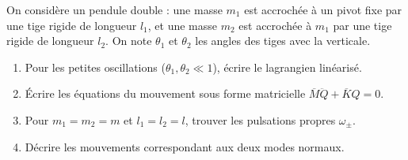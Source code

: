 \documentclass[12pt,a4paper]{article}
\begin{document}
\begin{boiteexercice}
On considère un pendule double : une masse $m_1$ est accrochée à un pivot fixe par une tige rigide de longueur $l_1$, et une masse $m_2$ est accrochée à $m_1$ par une tige rigide de longueur $l_2$. On note $\theta_1$ et $\theta_2$ les angles des tiges avec la verticale.
\begin{enumerate}
  \item Pour les petites oscillations ($\theta_1,\theta_2\ll 1$), écrire le lagrangien linéarisé.
  \item Écrire les équations du mouvement sous forme matricielle $\overline{M}\ddot{Q} + \overline{K}Q = 0$.
  \item Pour $m_1=m_2=m$ et $l_1=l_2=l$, trouver les pulsations propres $\omega_\pm$.
  \item Décrire les mouvements correspondant aux deux modes normaux.
\end{enumerate}
\end{boiteexercice}
\end{document}
